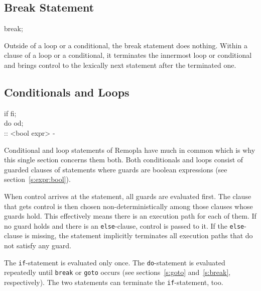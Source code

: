 \documentclass[a4paper,11pt,titlepage,english]{article}
\begin{document}
\subsection{Break Statement\label{s:break}}

\begin{bnfgrammar}
 \is break; \\
\end{bnfgrammar}

Outside of a loop or a conditional, the break statement does nothing. Within
a clause of a loop or a conditional, it terminates the innermost loop or
conditional and brings control to the lexically next statement after the
terminated one.



\subsection{Conditionals and Loops\label{s:ifloop}}

\begin{bnfgrammar}
[if statement] \is  if
                    fi; \\
[do statement] \is  do
                    od; \\
[guarded clause] \is :: <bool expr> -\>  \\
\end{bnfgrammar}

Conditional and loop statements of Remopla have much in common which is why
this single section concerns them both. Both conditionals and loops
consist of guarded clauses of statements where guards are boolean
expressions (see section~\ref{s:expr:bool}).

When control arrives at the statement, all guards are evaluated first. The
clause that gets control is then chosen non-deterministically among those
clauses whose guards hold. This effectively means there is an
execution path for each of them. If no guard holds and there
is an \verb|else|-clause, control is passed to it. If the
\verb|else|-clause is missing, the statement implicitly terminates all
execution paths that do not satisfy any guard.

The \verb|if|-statement is evaluated only once. The \verb|do|-statement is
evaluated repeatedly until \verb|break| or \verb|goto| occurs (see
sections~\ref{s:goto} and~\ref{s:break}, respectively). The two statements
can terminate the \verb|if|-statement, too.
\end{document}
